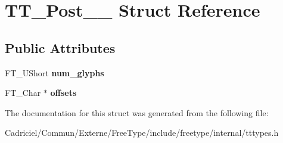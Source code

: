 \hypertarget{struct_t_t___post__25__}{}\section{T\+T\+\_\+\+Post\+\_\+\_\+ Struct Reference}
\label{struct_t_t___post__25__}
\subsection*{Public Attributes}
\begin{DoxyCompactItemize}
\item 
F\+T\+\_\+\+U\+Short {\bfseries num\+\_\+glyphs}\hypertarget{struct_t_t___post__25___aae397ce6206c910ecc13f8b46bace595}{}\label{struct_t_t___post__25___aae397ce6206c910ecc13f8b46bace595}

\item 
F\+T\+\_\+\+Char $\ast$ {\bfseries offsets}\hypertarget{struct_t_t___post__25___a499ec966b258c8454e9ea8f9455028b6}{}\label{struct_t_t___post__25___a499ec966b258c8454e9ea8f9455028b6}

\end{DoxyCompactItemize}


The documentation for this struct was generated from the following file\+:\begin{DoxyCompactItemize}
\item 
Cadriciel/\+Commun/\+Externe/\+Free\+Type/include/freetype/internal/tttypes.\+h\end{DoxyCompactItemize}
